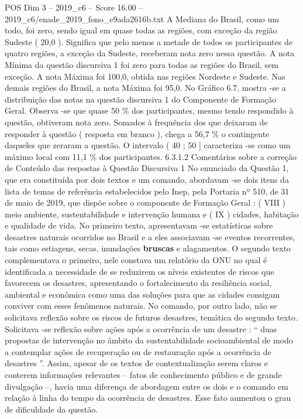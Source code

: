 \begin{textsample}{POS Dim 3 – 2019\_c6 – Score 16.00 – 2019\_c6/enade\_2019\_fono\_e9ada2616b.txt}
A Mediana do Brasil, como um todo, foi zero, sendo igual em quase todas as regiões, com exceção da região Sudeste ( 20,0 ).
Significa que pelo menos a metade de todos os participantes de quatro regiões, a exceção da Sudeste, receberam nota zero nessa questão.
A nota Mínima da questão discursiva 1 foi zero para todas as regiões do Brasil, sem exceção.
A nota Máxima foi 100,0, obtida nas regiões Nordeste e Sudeste.
Nas demais regiões do Brasil, a nota Máxima foi 95,0.
No Gráfico 6.7, mostra -se a distribuição das notas na questão discursiva 1 do Componente de Formação Geral.
Observa -se que quase 50 \% dos participantes, mesmo tendo respondido à questão, obtiveram nota zero.
Somados à frequência dos que deixaram de responder à questão ( resposta em branco ), chega a 56,7 \% o contingente daqueles que zeraram a questão.
O intervalo ( 40 ; 50 ] caracteriza -se como um máximo local com 11,1 \% dos participantes. 6.3.1.2 Comentários sobre a correção de Conteúdo das respostas à Questão Discursiva 1 No enunciado da Questão 1, que era constituída por dois textos e um comando, abordavam -se dois itens da lista de temas de referência estabelecidos pelo Inep, pela Portaria nº 510, de 31 de maio de 2019, que dispõe sobre o componente de Formação Geral : ( VIII ) meio ambiente, sustentabilidade e intervenção humana e ( IX ) cidades, habitação e qualidade de vida.
No primeiro texto, apresentavam -se estatísticas sobre desastres naturais ocorridos no Brasil e a eles associavam -se eventos recorrentes, tais como estiagens, secas, inundações \textbf{bruscas} e alagamentos.
O segundo texto complementava o primeiro, nele constava um relatório da ONU no qual é identificada a necessidade de se reduzirem os níveis existentes de riscos que favorecem os desastres, apresentando o fortalecimento da resiliência social, ambiental e econômica como uma das soluções para que as cidades consigam conviver com esses fenômenos naturais.
No comando, por outro lado, não se solicitava reflexão sobre os riscos de futuros desastres, temática do segundo texto.
Solicitava -se reflexão sobre ações após a ocorrência de um desastre : “ duas propostas de intervenção no âmbito da sustentabilidade socioambiental de modo a contemplar ações de recuperação ou de restauração após a ocorrência de desastres ”.
Assim, apesar de os textos de contextualização serem claros e conterem informações relevantes – fatos de conhecimento público e de grande divulgação –, havia uma diferença de abordagem entre os dois e o comando em relação à linha do tempo da ocorrência de desastres.
Esse fato aumentou o grau de dificuldade da questão.

\end{textsample}
